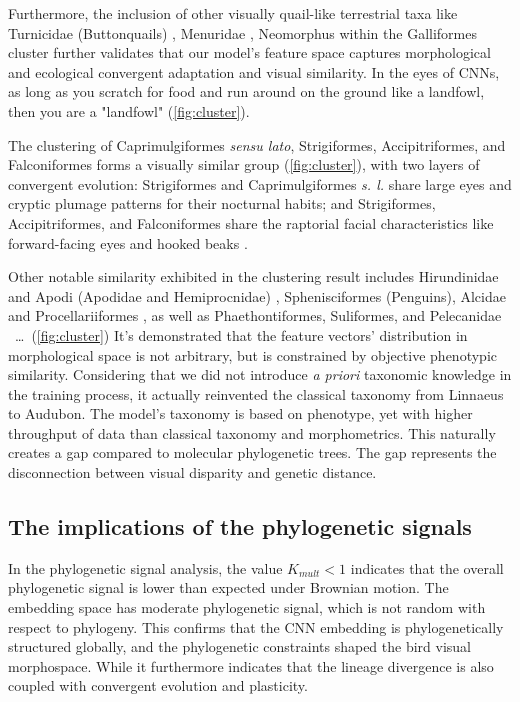 Furthermore, the inclusion of other visually quail-like terrestrial taxa like
Turnicidae (Buttonquails) \parencite{Rotthowe1998Evidence}, Menuridae \parencite{Winkler2020Lyrebirds},
Neomorphus \parencite{Haffer1977Neomorphus}
within the Galliformes cluster further validates that our model's feature space captures
morphological and ecological convergent adaptation and visual similarity. In the eyes of CNNs,
as long as you scratch for food and run around on the ground like a landfowl,
then you are a "landfowl" (\cref{fig:cluster}).

The clustering of Caprimulgiformes \textit{sensu lato}, Strigiformes, Accipitriformes, and Falconiformes
forms a visually similar group (\cref{fig:cluster}), with two layers of convergent evolution: Strigiformes and Caprimulgiformes \textit{s. l.}
share large eyes and cryptic plumage patterns for their nocturnal habits; and Strigiformes, Accipitriformes,
and Falconiformes share the raptorial facial characteristics like forward-facing eyes and hooked beaks
\parencite{Fidler2004Convergent, Wu2021Genomic}.

Other notable similarity exhibited in the clustering result includes
Hirundinidae and Apodi (Apodidae and Hemiprocnidae) \parencite{Norberg1986Insectivorous},
Sphenisciformes (Penguins), Alcidae and Procellariiformes \parencite{Cody1973Coexistence},
as well as Phaethontiformes, Suliformes, and Pelecanidae \parencite{Hedges1994Molecules}~\ldots~(\cref{fig:cluster})
It's demonstrated that the feature vectors' distribution in morphological space is not
arbitrary, but is constrained by objective phenotypic similarity. Considering that we did not
introduce \textit{a priori} taxonomic knowledge in the training process, it actually reinvented
the classical taxonomy from Linnaeus to Audubon. The model's taxonomy is based on phenotype,
yet with higher throughput of data than classical taxonomy and morphometrics.
This naturally creates a gap compared to molecular phylogenetic trees.
The gap represents the disconnection between visual disparity and genetic distance.

\subsection{The implications of the phylogenetic signals}\label{subsect:phylosignal-discussion}

In the phylogenetic signal analysis, the value $K_{mult} < 1$ indicates that the overall phylogenetic signal is lower than expected under Brownian motion.
The embedding space has moderate phylogenetic signal, which is not random with respect to phylogeny.
This confirms that the CNN embedding is phylogenetically structured globally, and the phylogenetic constraints shaped the bird visual morphospace.
While it furthermore indicates that the lineage divergence is also coupled with convergent evolution and plasticity. 

